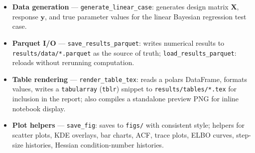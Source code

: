 \documentclass[11pt,a4paper]{article}
\begin{document}
\begin{itemize}
  \item \textbf{Data generation} — \texttt{generate\_linear\_case}: generates design matrix $\bm{X}$, response $\bm{y}$, and true parameter values for the linear Bayesian regression test case.
  \item \textbf{Parquet I/O} — \texttt{save\_results\_parquet}: writes numerical results to \texttt{results/data/*.parquet} as the source of truth; \texttt{load\_results\_parquet}: reloads without rerunning computation.
  \item \textbf{Table rendering} — \texttt{render\_table\_tex}: reads a polars DataFrame, formats values, writes a \texttt{tabularray} (\texttt{tblr}) snippet to \texttt{results/tables/*.tex} for \verb|| inclusion in the report; also compiles a standalone preview PNG for inline notebook display.
  \item \textbf{Plot helpers} — \texttt{save\_fig}: saves to \texttt{figs/} with consistent style; helpers for scatter plots, KDE overlays, bar charts, ACF, trace plots, ELBO curves, step-size histories, Hessian condition-number histories.
\end{itemize}
\end{document}
